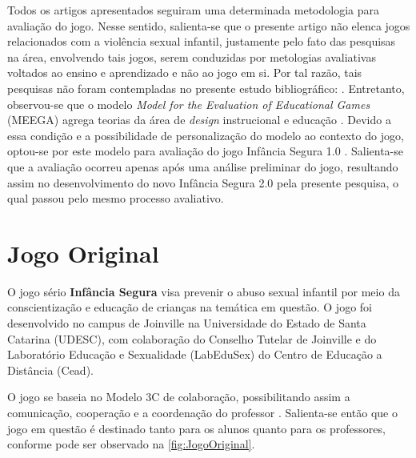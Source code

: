 \documentclass[alpha-refs,brazilian]{RBCA_v2.0}
\begin{document}
Todos os artigos apresentados \citep{oliveira2015avaliaccao, limeira2015avaliaccao, rombaldi2016educacorpohumano3d, lopes2012avaliaccao} seguiram uma determinada metodologia para avaliação do jogo. Nesse sentido, salienta-se que o presente artigo não elenca jogos relacionados com a violência sexual infantil, justamente pelo fato das pesquisas na área, envolvendo tais jogos, serem conduzidas por metologias avaliativas voltados ao ensino e aprendizado e não ao jogo em si. Por tal razão, tais pesquisas não foram contempladas no presente estudo bibliográfico: \citep{jones2010being, AnnaErgebnisse2012, jones2020serious}. Entretanto, observou-se que o modelo \textit{Model for the Evaluation of Educational Games} (MEEGA) agrega teorias da área de \textit{design} instrucional e educação \citep{savi2011model}. Devido a essa condição e a possibilidade de personalização do modelo ao contexto do jogo, optou-se por este modelo para avaliação do jogo Infância Segura 1.0 \citep{diocesano2018jogo}. Salienta-se que a avaliação ocorreu apenas após uma análise preliminar do jogo, resultando assim no desenvolvimento do novo Infância Segura 2.0 pela presente pesquisa, o qual passou pelo mesmo processo avaliativo. 



\section{Jogo Original}\label{secao:InfanciaSeguraOriginal}

O jogo sério \textbf{Infância Segura} visa prevenir o abuso sexual infantil por meio da conscientização e educação de crianças na temática em questão. O jogo foi desenvolvido no campus de Joinville na Universidade do Estado de Santa Catarina (UDESC), com colaboração do Conselho Tutelar de Joinville e do Laboratório Educação e Sexualidade (LabEduSex) do Centro de Educação a Distância (Cead).

O jogo se baseia no Modelo 3C de colaboração, possibilitando assim a comunicação, cooperação e a coordenação do professor \citep{pimentel2006modelo}. Salienta-se então que o jogo em questão é destinado tanto para os alunos quanto para os professores, conforme pode ser observado na \cref{fig:JogoOriginal}.
\end{document}
